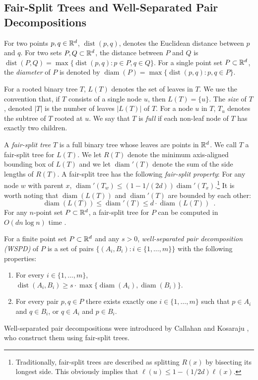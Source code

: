 \documentclass{patmorin}
\DeclareMathOperator{\diam}{diam}
\DeclareMathOperator{\dist}{dist}
\begin{document}
\subsection{Fair-Split Trees and Well-Separated Pair Decompositions}

For two points $p,q\in\mathbb{R}^d$, $\dist(p,q)$, denotes the Euclidean distance
between $p$ and $q$. For two sets $P,Q\subset\mathbb{R}^d$, the distance between
$P$ and $Q$ is $\dist(P,Q)=\max\{\dist(p,q):p\in P, q\in Q\}$.  For a
single point set $P\subset\mathbb{R}^d$, the \emph{diameter} of $P$ is denoted
by $\diam(P)=\max\{\dist(p,q):p,q\in P\}$.

For a rooted binary tree $T$, $L(T)$ denotes the set of leaves in
$T$. We use the convention that, if $T$ consists of a single node $u$,
then $L(T)=\{u\}$. The \emph{size} of $T$, denoted $|T|$ is the number of
leaves $|L(T)|$ of $T$. For a node $u$ in $T$, $T_u$ denotes the subtree
of $T$ rooted at $u$.  We say that $T$ is \emph{full} if each non-leaf
node of $T$ has exactly two children.

A \emph{fair-split tree} $T$ is a full binary tree whose
leaves are points in $\mathbb{R}^d$.  We call $T$ a fair-split tree for $L(T)$.
We let $R(T)$ denote the minimum
axis-aligned bounding box of $L(T)$ and we let $\diam'(T)$ denote the
sum of the side lengths of $R(T)$.  A fair-split tree has the following
\emph{fair-split property}: For any node $w$ with parent $x$, $\diam'(T_w)
\le (1-1/(2d))\diam'(T_x)$.\footnote{Traditionally, fair-split trees
are described as splitting $R(x)$ by bisecting its longest side.
This obviously implies that $\ell(u)\le 1-(1/2d)\ell(x)$.} It is worth
noting that $\diam(L(T))$ and $\diam'(T)$ are bounded by each other:
\[
	\diam(L(T)) \le \diam'(T) \le d\cdot\diam(L(T)) \enspace .
\]	
For any $n$-point set $P\subset\mathbb{R}^d$, a fair-split tree for $P$ can be
computed in $O(dn\log n)$ time \cite{callahan.kosaraju:decomposition}.

For a finite point set $P\subset\mathbb{R}^d$ and any $s>0$,
\emph{well-separated pair decomposition (WSPD)} of $P$ is a set of pairs
$\{(A_i,B_i):i\in\{1,\ldots,m\}\}$ with the following properties:
\begin{enumerate}
  \item For every $i\in\{1,\ldots,m\}$, 
    $\dist(A_i,B_i)\ge s\cdot\max\{\diam(A_i),\diam(B_i)\}$.
  \item For every pair $p,q\in P$ there exists exactly one
    $i\in\{1,\ldots,m\}$ such that $p\in A_i$ and $q\in B_i$, or $q\in A_i$
    and $p\in B_i$.
\end{enumerate}
Well-separated pair decompositions were introduced by Callahan and
Kosaraju \cite{callahan.kosaraju:decomposition}, who construct them
using fair-split trees.
\end{document}
